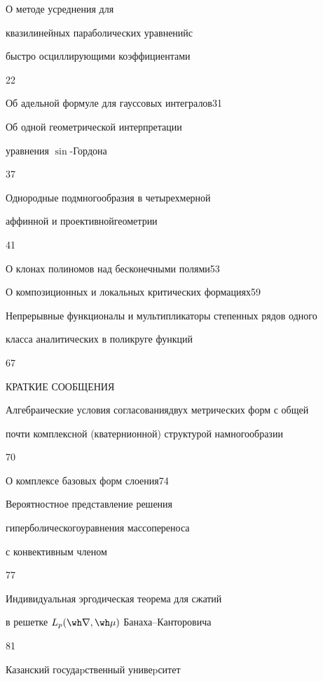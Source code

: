 {О методе усреднения для 


квазилинейных параболических уравнений\newline с 


быстро осциллирующими коэффициентами}{22}




{Об адельной формуле для гауссовых интегралов}{31}




{Об одной геометрической интерпретации 


уравнения $\sin$-Гордона}{37}




{Однородные подмногообразия в четырехмерной 


аффинной и проективной\newline геометрии}{41}




{О клонах полиномов над бесконечными полями}{53}




{О композиционных и локальных критических формациях}{59}




{Непрерывные функционалы и мультипликаторы степенных рядов одного \newline


класса аналитических в поликруге функций}{67}





\bigskip





\centerline{КРАТКИЕ СООБЩЕНИЯ}


\bigskip







{Алгебраические условия согласования\newline двух метрических форм с общей


почти комплексной (кватернионной) структурой на\newline многообразии}{70}




{О комплексе базовых форм слоения}{74}




{Вероятностное представление решения 


гиперболического\newline уравнения массопереноса 


с конвективным членом}{77}




{Индивидуальная эргодическая теорема для сжатий  \newline


в решетке $L_p(\wh\nabla,\wh\mu)$ Банаха--Канторовича}{81}








\vfill


\noindent\raisebox{2pt}{\copyright} Казанский госудаpственный унивеpситет





